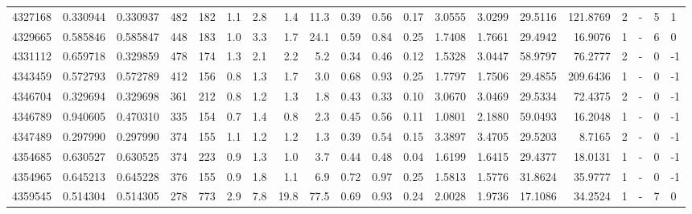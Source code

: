 \begin{tabular}{rrrrrrrrrrrrrrrrrlrl}
   4327168 & 0.330944 &   0.330937 &  482 &  182 &      1.1 &      2.8 &     1.4 &     11.3 &       0.39 &        0.56 &        0.17 &  3.0555 &  3.0299 &   29.5116 &  121.8769 &       2 &             - &        5 &         1 \\
   4329665 & 0.585846 &   0.585847 &  448 &  183 &      1.0 &      3.3 &     1.7 &     24.1 &       0.59 &        0.84 &        0.25 &  1.7408 &  1.7661 &   29.4942 &   16.9076 &       1 &             - &        6 &         0 \\
   4331112 & 0.659718 &   0.329859 &  478 &  174 &      1.3 &      2.1 &     2.2 &      5.2 &       0.34 &        0.46 &        0.12 &  1.5328 &  3.0447 &   58.9797 &   76.2777 &       2 &             - &        0 &        -1 \\
   4343459 & 0.572793 &   0.572789 &  412 &  156 &      0.8 &      1.3 &     1.7 &      3.0 &       0.68 &        0.93 &        0.25 &  1.7797 &  1.7506 &   29.4855 &  209.6436 &       1 &             - &        0 &        -1 \\
   4346704 & 0.329694 &   0.329698 &  361 &  212 &      0.8 &      1.2 &     1.3 &      1.8 &       0.43 &        0.33 &        0.10 &  3.0670 &  3.0469 &   29.5334 &   72.4375 &       2 &             - &        0 &        -1 \\
   4346789 & 0.940605 &   0.470310 &  335 &  154 &      0.7 &      1.4 &     0.8 &      2.3 &       0.45 &        0.56 &        0.11 &  1.0801 &  2.1880 &   59.0493 &   16.2048 &       1 &             - &        0 &        -1 \\
   4347489 & 0.297990 &   0.297990 &  374 &  155 &      1.1 &      1.2 &     1.2 &      1.3 &       0.39 &        0.54 &        0.15 &  3.3897 &  3.4705 &   29.5203 &    8.7165 &       2 &             - &        0 &        -1 \\
   4354685 & 0.630527 &   0.630525 &  374 &  223 &      0.9 &      1.3 &     1.0 &      3.7 &       0.44 &        0.48 &        0.04 &  1.6199 &  1.6415 &   29.4377 &   18.0131 &       1 &             - &        0 &        -1 \\
   4354965 & 0.645213 &   0.645228 &  376 &  155 &      0.9 &      1.8 &     1.1 &      6.9 &       0.72 &        0.97 &        0.25 &  1.5813 &  1.5776 &   31.8624 &   35.9777 &       1 &             - &        0 &        -1 \\
   4359545 & 0.514304 &   0.514305 &  278 &  773 &      2.9 &      7.8 &    19.8 &     77.5 &       0.69 &        0.93 &        0.24 &  2.0028 &  1.9736 &   17.1086 &   34.2524 &       1 &             - &        7 &         0 \\

\end{tabular}
